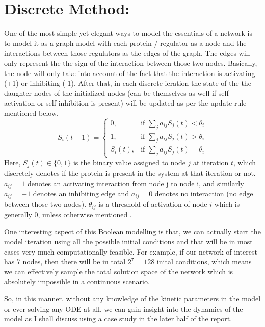 \documentclass{article}
\begin{document}
\section*{Discrete Method:}
One of the most simple yet elegant ways to model the essentials of a network is
to model it as a graph model with each protein / regulator as 
a node and the interactions between those regulators as the edges of the graph.
The edges will only represent the the sign of the interaction between those two nodes.
Basically, the node will only take into account of the fact that 
the interaction is activating (+1) or inhibiting (-1). After that, in each 
discrete ieration the state of the the daughter nodes of the initialized nodes 
(can be themselves as well if self-activation or self-inhibition is present)
will be updated as per the update rule mentioned below.
\begin{equation*}
  S_i (t+1) = \begin{cases}
    0, & \text{if } \sum_{j} a_{ij} S_j(t) < \theta_i\\
    1, & \text{if } \sum_{j} a_{ij} S_j(t) > \theta_i\\
    S_i (t), & \text{if } \sum_{j} a_{ij} S_j(t) = \theta_i
    \end{cases}
\end{equation*}
Here, $S_j(t) \in \{0,1\}$ is the binary value assigned to node $j$ at iteration
$t$, which discretely denotes if the protein is present in the system at that 
iteration or not. $a_{ij} = 1$ denotes an activating interaction from node j to 
node i, and similarly $a_{ij} = -1$ denotes an inhibiting edge and $a_{ij} = 0$
denotes no interaction (no edge between those two nodes). $\theta_{ij}$ is a 
threshold of activation of node $i$ which is generally $0$, unless otherwise 
mentioned \cite{boolean_model}.

One interesting aspect of this Boolean modelling is that, we can actually 
start the model iteration using all the possible initial conditions and that 
will be in most cases very much computationally feasible. For example, if our 
network of interest has 7 nodes, then there will be in total $2^7 = 128$ inital conditions, which 
means we can effectively sample the total solution space of the network which 
is absolutely impossible in a continuous scenario.

So, in this manner, without any knowledge of the kinetic parameters in the model
or ever solving any ODE at all, we can gain insight into the dynamics of the model
as I shall discuss using a case study in the later half of the report.
\end{document}
